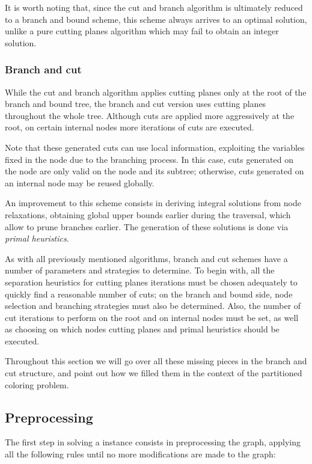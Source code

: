 It is worth noting that, since the cut and branch algorithm is ultimately reduced to a branch and bound scheme, this scheme always arrives to an optimal solution, unlike a pure cutting planes algorithm which may fail to obtain an integer solution.

\subsubsection{Branch and cut}

While the cut and branch algorithm applies cutting planes only at the root of the branch and bound tree, the branch and cut version uses cutting planes throughout the whole tree. Although cuts are applied more aggressively at the root, on certain internal nodes more iterations of cuts are executed. 

Note that these generated cuts can use local information, exploiting the variables fixed in the node due to the branching process. In this case, cuts generated on the node are only valid on the node and its subtree; otherwise, cuts generated on an internal node may be reused globally.

An improvement to this scheme consists in deriving integral solutions from node relaxations, obtaining global upper bounds earlier during the traversal, which allow to prune branches earlier. The generation of these solutions is done via \textit{primal heuristics}.

As with all previously mentioned algorithms, branch and cut schemes have a number of parameters and strategies to determine. To begin with, all the separation heuristics for cutting planes iterations must be chosen adequately to quickly find a reasonable number of cuts; on the branch and bound side, node selection and branching strategies must also be determined. Also, the number of cut iterations to perform on the root and on internal nodes must be set, as well as choosing on which nodes cutting planes and primal heuristics should be executed.

Throughout this section we will go over all these missing pieces in the branch and cut structure, and point out how we filled them in the context of the partitioned coloring problem.

\subsection{Preprocessing}

The first step in solving a \PCP{} instance consists in preprocessing the graph, applying all the following rules until no more modifications are made to the graph:


